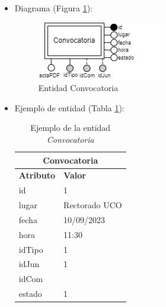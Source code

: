 \begin{itemize}
    \item Diagrama (Figura \ref{fig:E-Convocatoria}):

    \begin{figure}[H]
        \centering
        \includegraphics[scale=0.8]{img/diagramas/EER/E-Convocatoria.png}
        \caption{Entidad Convocatoria}
        \label{fig:E-Convocatoria}
    \end{figure}

    \item Ejemplo de entidad (Tabla \ref{table:T-Convocatoria}):

    \begin{table}[H]
    \centering
        \begin{tabular}{ |p{6cm}||p{6cm}|  }
             \hline
                \multicolumn{2}{|c|}{\textbf{Convocatoria}} \\
             \hline
                 \textbf{Atributo} & \textbf{Valor} \\
             \hline
                 id & 1 \\
             \hline
                 lugar & Rectorado UCO \\
            \hline
                 fecha & 10/09/2023 \\
             \hline
                 hora & 11:30 \\
             \hline
                 idTipo & 1 \\
             \hline
                 idJun & 1 \\
             \hline
                idCom &  \\
             \hline
                 estado & 1 \\
        \end{tabular}
        \caption{Ejemplo de la entidad \textit{Convocatoria}}
        \label{table:T-Convocatoria}
    \end{table}
\end{itemize}

